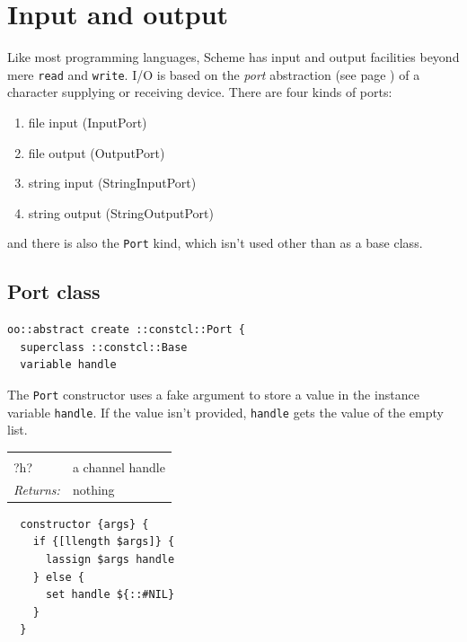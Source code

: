 \documentclass[a5paper,draft]{memoir}
\begin{document}
\section{Input and output}
\label{input-and-output}

Like most programming languages, Scheme has input and output facilities beyond mere \texttt{read} and \texttt{write}. I/O is based on the \emph{port} abstraction (see page \pageref{ports}) of a character supplying or receiving device. There are four kinds of ports:

\begin{enumerate}
\item file input (InputPort)
\item file output (OutputPort)
\item string input (StringInputPort)
\item string output (StringOutputPort)
\end{enumerate}

and there is also the \texttt{Port} kind, which isn't used other than as a base class.

\subsection{Port class}
\label{port-class}

\begin{lstlisting}
oo::abstract create ::constcl::Port {
  superclass ::constcl::Base
  variable handle
\end{lstlisting}

The \texttt{Port} constructor uses a fake argument to store a value in the instance variable \texttt{handle}. If the value isn't provided, \texttt{handle} gets the value of the empty list.

\noindent\begin{tabular}{ |p{1.9cm} p{6.5cm}| }
\hline
\rowcolor[HTML]{CCCCCC} \multicolumn{2}{|l|}{\textbf{Port constructor (internal)}} \\
?h? & a channel handle \\
\textit{Returns:} & nothing \\
\hline
\end{tabular}

\begin{lstlisting}
  constructor {args} {
    if {[llength $args]} {
      lassign $args handle
    } else {
      set handle ${::#NIL}
    }
  }
\end{lstlisting}
\end{document}
